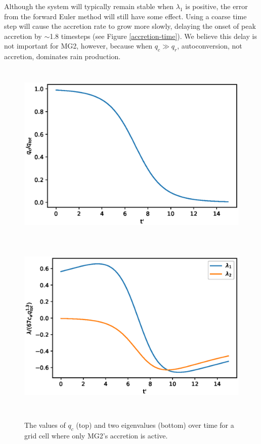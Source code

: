 \documentclass [11pt, proquest] {uwthesis}[2020/02/24]
\begin{document}
Although the system will typically remain stable when $\lambda_1$ is positive, the error from the forward Euler method will still have some effect. Using a coarse time step will cause the accretion rate to grow more slowly, delaying the onset of peak accretion by $\sim$\num{1.8} timesteps (see Figure \ref{accretion-time}). We believe this delay is not important for MG2, however, because when $q_c \gg q_r$, autoconversion, not accretion, dominates rain production.

\begin{figure}[htbp]
\begin{center}
  \includegraphics[height=3.5in]{./accretion_qc.eps}
  \includegraphics[height=3.5in]{./accretion_lambdas.eps}
\end{center}
  \caption[Trajectories of accretion subsystem]{The values of $q_c$ (top) and two eigenvalues (bottom) over time for a grid cell where only MG2's accretion is active.}
  \label{accretion-trajectory}
\end{figure}
\end{document}
